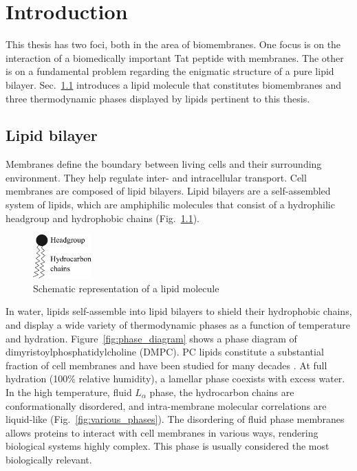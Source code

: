 \chapter{Introduction}
This thesis has two foci, both in the area of biomembranes.
One focus is on the interaction of a biomedically important Tat peptide with 
membranes.
The other is on a fundamental problem regarding the enigmatic structure of a
pure lipid bilayer.
Sec.~\ref{sec:lipid_bilayer} introduces a lipid molecule that constitutes
biomembranes and three thermodynamic phases displayed by lipids pertinent to this 
thesis.

\section{Lipid bilayer}\label{sec:lipid_bilayer}
Membranes define the boundary between living cells
and their surrounding environment. They help regulate inter- and intracellular
transport. Cell membranes are composed of lipid bilayers.
Lipid bilayers are a self-assembled system of lipids, which are 
amphiphilic molecules that consist of a hydrophilic headgroup
and hydrophobic chains (Fig.~\ref{fig:lipid}).

\begin{figure}
  \centering
  \includegraphics[width=0.2\textwidth]{figures/lipid}
  \caption{Schematic representation of a lipid molecule}
  \label{fig:lipid}
\end{figure}

In water, lipids self-assemble into lipid bilayers to shield their hydrophobic 
chains, and display a wide variety of thermodynamic phases
as a function of temperature and hydration. Figure~\ref{fig:phase_diagram}
shows a phase diagram of dimyristoylphosphatidylcholine (DMPC).
PC lipids constitute a substantial fraction of cell membranes
and have been studied for many decades \cite{Nagle00}.
At full hydration (100\% relative humidity), a lamellar phase coexists with excess water.
In the high temperature, fluid $L_\alpha$ phase, the hydrocarbon chains 
are conformationally disordered, and intra-membrane molecular correlations 
are liquid-like \cite{ref:Fahey78} (Fig.~\ref{fig:various_phases}).
The disordering of fluid phase membranes allows proteins to 
interact with cell membranes in various ways, rendering biological systems
highly complex. 
This phase is usually considered the most biologically relevant.

